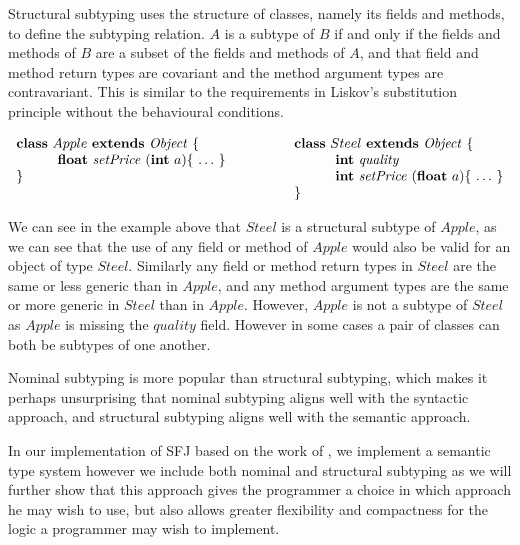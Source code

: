 \documentclass{l4proj}
\begin{document}
Structural subtyping uses the structure of classes, namely its fields and methods, to define the subtyping relation. $A$ is a subtype of $B$ if and only if the fields and methods of $B$ are a subset of the fields and methods of $A$, and that field and method return types are covariant and the method argument types are contravariant. This is similar to the requirements in Liskov's substitution principle \citep{Liskov1994} without the behavioural conditions.

$$
    \begin{array}{ll}
        \syndecl{Apple}{\mathit{Object}} {
         &
            \qquad
            \syndecl{Steel}{\mathit{Object}} {
                \\
                \qquad\quad \mathbf{float}\ \mathit{setPrice}\ (\mathbf{int}\ a)\{\ \ldots\ \}\qquad
         &
                \qquad\qquad\quad \mathbf{int}\ \mathit{quality}\
                \\
            }
            \qquad\quad\qquad
         &
            \qquad\qquad\quad \mathbf{int}\ \mathit{setPrice}\ (\mathbf{float}\ a)\{\ \ldots\ \}
            \\
         &
            \qquad }
    \end{array}
$$

We can see in the example above that $Steel$ is a structural subtype of $Apple$, as we can see that the use of any field or method of $Apple$ would also be valid for an object of type $Steel$. Similarly any field or method return types in $Steel$ are the same or less generic than in $Apple$, and any method argument types are the same or more generic in $Steel$ than in $Apple$. However, $Apple$ is not a subtype of $Steel$ as $Apple$ is missing the $quality$ field. However in some cases a pair of classes can both be subtypes of one another.

Nominal subtyping is more popular than structural subtyping, which makes it perhaps unsurprising that nominal subtyping aligns well with the syntactic approach, and structural subtyping aligns well with the semantic approach.

In our implementation of SFJ based on the work of \citet{Dardha2017, Dardha2013}, we implement a semantic type system however we include both nominal and structural subtyping as we will further show that this approach gives the programmer a choice in which approach he may wish to use, but also allows greater flexibility and compactness for the logic a programmer may wish to implement.
\end{document}
